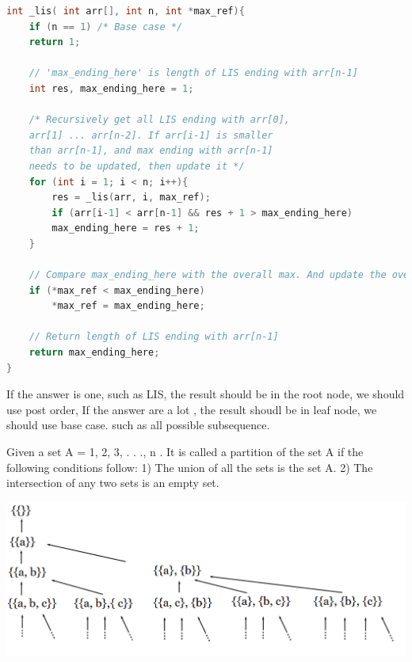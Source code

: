\documentclass[a4paper,11pt,twoside]{book}
\begin{document}
\begin{lstlisting}[frame=single, language=c++]
int _lis( int arr[], int n, int *max_ref){
	if (n == 1) /* Base case */
	return 1;
	
	// 'max_ending_here' is length of LIS ending with arr[n-1]
	int res, max_ending_here = 1;
	
	/* Recursively get all LIS ending with arr[0],
	arr[1] ... arr[n-2]. If arr[i-1] is smaller
	than arr[n-1], and max ending with arr[n-1]
	needs to be updated, then update it */
	for (int i = 1; i < n; i++){
		res = _lis(arr, i, max_ref);
		if (arr[i-1] < arr[n-1] && res + 1 > max_ending_here)
		max_ending_here = res + 1;
	}
	
	// Compare max_ending_here with the overall max. And update the overall max if needed
	if (*max_ref < max_ending_here)
		*max_ref = max_ending_here;
	
	// Return length of LIS ending with arr[n-1]
	return max_ending_here;
}	
\end{lstlisting}	
	
	
	\par If the answer is one, such as LIS, the result should be in the root node, we should use post order, If the answer are a lot , the result shoudl be in leaf node, we should use base case. such as all possible subsequence. 
	
	
	\par Given a set A = {1, 2, 3, . . ., n }. It is called a partition of the set A if the following conditions follow: 1) The union of all the sets is the set A. 2) The intersection of any two sets is an empty set.

\begin{center}
	\includegraphics[scale=0.25]{pics/bell.png}
\end{center}
	
\end{document}
